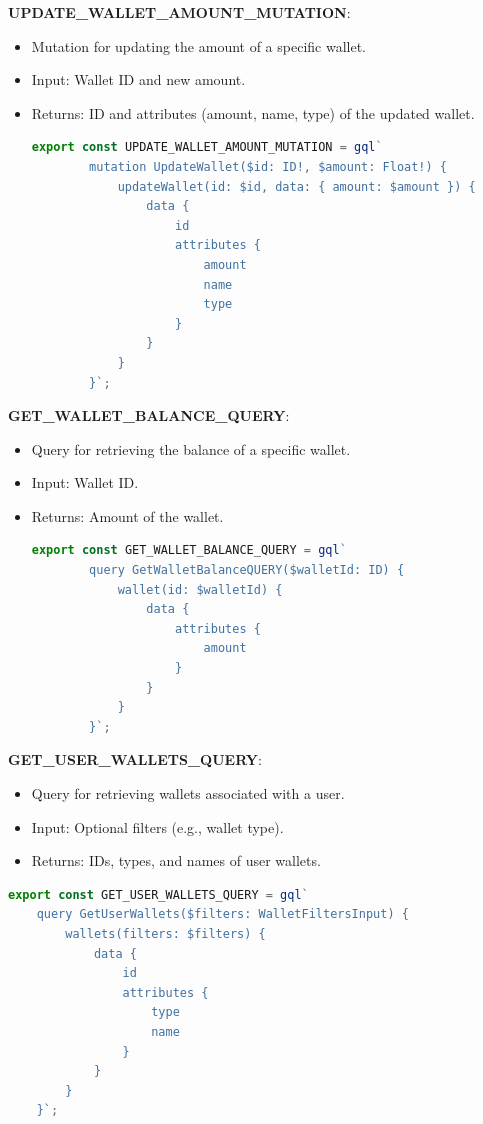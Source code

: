 \item \textbf{UPDATE\_WALLET\_AMOUNT\_MUTATION}:
\begin{itemize}
    \item Mutation for updating the amount of a specific wallet.
    \item Input: Wallet ID and new amount.
    \item Returns: ID and attributes (amount, name, type) of the updated wallet.
    \begin{lstlisting}[language=TypeScript]
    export const UPDATE_WALLET_AMOUNT_MUTATION = gql`
        mutation UpdateWallet($id: ID!, $amount: Float!) {
            updateWallet(id: $id, data: { amount: $amount }) {
                data {
                    id
                    attributes {
                        amount
                        name
                        type
                    }
                }
            }
        }`;
    \end{lstlisting}
\end{itemize}

\item \textbf{GET\_WALLET\_BALANCE\_QUERY}:
\begin{itemize}
    \item Query for retrieving the balance of a specific wallet.
    \item Input: Wallet ID.
    \item Returns: Amount of the wallet.
    \begin{lstlisting}[language=TypeScript]
    export const GET_WALLET_BALANCE_QUERY = gql`
        query GetWalletBalanceQUERY($walletId: ID) {
            wallet(id: $walletId) {
                data {
                    attributes {
                        amount
                    }
                }
            }
        }`;
    \end{lstlisting}
\end{itemize}

\item \textbf{GET\_USER\_WALLETS\_QUERY}:
\begin{itemize}
    \item Query for retrieving wallets associated with a user.
    \item Input: Optional filters (e.g., wallet type).
    \item Returns: IDs, types, and names of user wallets.
\end{itemize}
\begin{lstlisting}[language=TypeScript]
export const GET_USER_WALLETS_QUERY = gql`
    query GetUserWallets($filters: WalletFiltersInput) {
        wallets(filters: $filters) {
            data {
                id
                attributes {
                    type
                    name
                }
            }
        }
    }`;
\end{lstlisting}

